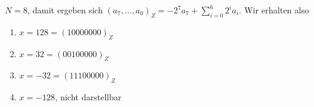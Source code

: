 $N = 8$, damit ergeben sich 
$(a_7, \dots, a_0)_{Z} = -2^{7}a_7 + \sum_{i=0}^{6} 2^i a_i$. Wir erhalten also
\begin{enumerate}
	\item $x = 128 = (10000000)_{Z}$
	\item $x = 32 =  (00100000)_{Z}$
	\item $x = -32 = (11100000)_{Z}$
	\item $x = -128$, nicht darstellbar
\end{enumerate}
